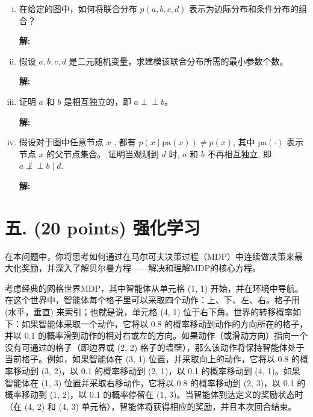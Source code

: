 \documentclass[8pt]{article}
\begin{document}
    \begin{enumerate}[(i)]
        \item 

        在给定的图中，如何将联合分布 $p(a, b, c, d)$ 表示为边际分布和条件分布的组合？
        
        \textbf{\large 解:}
        \vspace{3em}

        \item 

        假设 $a, b, c, d$ 是二元随机变量，求建模该联合分布所需的最小参数个数。
        
        \textbf{\large 解:}
        \vspace{3em}

        \item 
        
        证明 $a$ 和 $b$ 是相互独立的，即 \(a \perp\!\!\!\perp b\)。
        
        \textbf{\large 解:}
        \vspace{3em}


        \item 
        假设对于图中任意节点 $x$ , 都有 $p(x \mid \text{pa}(x)) \neq p(x)$, 其中 $\text{pa}(\cdot)$ 表示节点 $x$ 的父节点集合。
        证明当观测到 $d$ 时, $a$ 和 $b$ 不再相互独立, 即 \(a \not\perp\!\!\!\perp b \mid d\). 
        
        \textbf{\large 解:}
        \vspace{3em}

    \end{enumerate}

\newpage
\section*{五. (20 points) 强化学习}

在本问题中，你将思考如何通过在马尔可夫决策过程（MDP）中连续做决策来最大化奖励，并深入了解贝尔曼方程——解决和理解MDP的核心方程。

考虑经典的网格世界MDP，其中智能体从单元格 (1, 1) 开始，并在环境中导航。在这个世界中，智能体每个格子里可以采取四个动作：上、下、左、右。格子用 (水平，垂直) 来索引；也就是说，单元格 (4, 1) 位于右下角。世界的转移概率如下：如果智能体采取一个动作，它将以 0.8 的概率移动到动作的方向所在的格子，并以 0.1 的概率滑到动作的相对右或左的方向。如果动作（或滑动方向）指向一个没有可通过的格子（即边界或 (2, 2) 格子的墙壁），那么该动作将保持智能体处于当前格子。例如，如果智能体在 (3, 1) 位置，并采取向上的动作，它将以 0.8 的概率移动到 (3, 2)，以 0.1 的概率移动到 (2, 1)，以 0.1 的概率移动到 (4, 1)。如果智能体在 (1, 3) 位置并采取右移动作，它将以 0.8 的概率移动到 (2, 3)，以 0.1 的概率移动到 (1, 2)，以 0.1 的概率停留在 (1, 3)。当智能体到达定义的奖励状态时（在 (4, 2) 和 (4, 3) 单元格），智能体将获得相应的奖励，并且本次回合结束。
\end{document}

